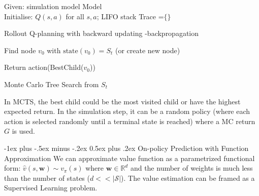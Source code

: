\documentclass[10pt,landscape]{article}
\makeatletter
\renewcommand{\section}{\@startsection{section}{1}{0mm}%
                                {-1ex plus -.5ex minus -.2ex}%
                                {0.5ex plus .2ex}%
                                {\normalfont\large\bfseries}}
\makeatother
\begin{document}
\begin{multicols}{3}
\begin{algorithm}[H]
Given: simulation model Model \\
Initialise: $Q(s,a)$ for all $s,a$; LIFO stack Trace =$\{\}$ \\

\caption{Rollout Q-planning with backward updating -backpropagation}
\end{algorithm}

\begin{algorithm}[H]
    Find node $v_0$ with $\text{state}(v_0) = S_t$ (or create new node) \\

Return action(BestChild($v_0$))
\caption{Monte Carlo Tree Search from $S_t$}
\end{algorithm}

In MCTS, the best child could be the most visited child or have the highest expected return. In the simulation step, it can be a random policy (where each action is selected randomly until a terminal state is reached) where a MC return $G$ is used.





\section{On-policy Prediction with Function Approximation}
We can approximate value function as a parametrized functional form: $\hat{v}(s,\mathbf{w}) \sim v_{\pi}(s)$ where $\mathbf{w} \in \mathbb{R}^d$ and the number of weights is much less than the number of states ($d << |\mathcal{S}|$).
The value estimation can be framed as a Supervised Learning problem.\\


\end{multicols}
\end{document}

